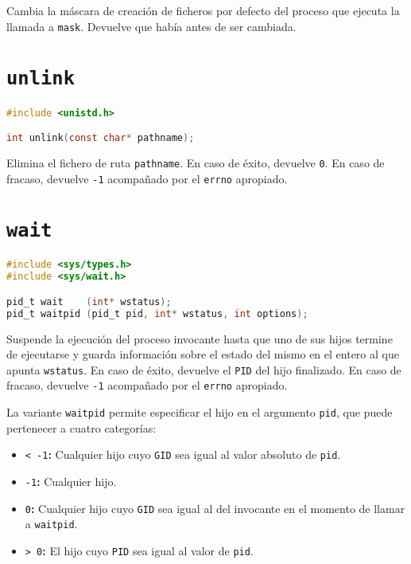 Cambia la máscara de creación de ficheros por defecto del proceso que ejecuta la llamada a \texttt{mask}.
Devuelve que había antes de ser cambiada.

\pagebreak

\section{\texttt{unlink}}\label{unlink}

\begin{lstlisting}[language=C]
#include <unistd.h>

int unlink(const char* pathname);
\end{lstlisting}

Elimina el fichero de ruta \texttt{pathname}.
En caso de éxito, devuelve \texttt{0}.
En caso de fracaso, devuelve \texttt{-1} acompañado por el \texttt{errno} apropiado.

\section{\texttt{wait}}\label{wait}

\begin{lstlisting}[language=C]
#include <sys/types.h>
#include <sys/wait.h>

pid_t wait    (int* wstatus);
pid_t waitpid (pid_t pid, int* wstatus, int options);
\end{lstlisting}

Suspende la ejecución del proceso invocante hasta que uno de sus hijos termine de ejecutarse y guarda información sobre el estado del mismo en el entero al que apunta \texttt{wstatus}.
En caso de éxito, devuelve el \texttt{PID} del hijo finalizado.
En caso de fracaso, devuelve \texttt{-1} acompañado por el \texttt{errno} apropiado.

La variante \texttt{waitpid} permite especificar el hijo en el argumento \texttt{pid}, que puede pertenecer a cuatro categorías:

\begin{itemize}
	\item\texttt{< -1}\textbf{:} Cualquier hijo cuyo \texttt{GID} sea igual al valor absoluto de \texttt{pid}.
	\item\texttt{-1}\textbf{:} Cualquier hijo.
	\item\texttt{0}\textbf{:} Cualquier hijo cuyo \texttt{GID} sea igual al del invocante en el momento de llamar a \texttt{waitpid}.
	\item\texttt{> 0}\textbf{:} El hijo cuyo \texttt{PID} sea igual al valor de \texttt{pid}.
\end{itemize}

